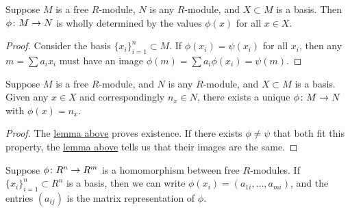 \begin{lemma}\label{lem:free-module-homomorphism}
    Suppose \(M\) is a free \(R\)-module, \(N\) is any \(R\)-module,
    and \(X \subset M\) is a basis.
    Then \(\phi\colon M\to N\) is wholly determined by the values \(\phi(x)\) for all \(x \in X\).
\end{lemma}
\begin{proof}
    Consider the basis \({\{x_i\}}_{i=1}^n \subset M\).
    If \(\phi(x_i) = \psi(x_i)\) for all \(x_i\),
    then any \(m = \sum a_i x_i\) must have an image
    \(\phi(m) = \sum a_i \phi(x_i) = \psi(m)\).
\end{proof}
\begin{theorem}
    Suppose \(M\) is a free \(R\)-module, and \(N\) is any \(R\)-module,
    and \(X \subset M\) is a basis.
    Given any \(x \in X\) and correspondingly \(n_x \in N\),
    there exists a unique \(\phi\colon M\to N\) with \(\phi(x) = n_x\).
\end{theorem}
\begin{proof}
    The \hyperref[lem:free-module-homomorphism]{lemma above} proves existence.
    If there exists \(\phi \neq \psi\) that both fit this property,
    the \hyperref[lem:free-module-homomorphism]{lemma above}
    tells us that their images are the same.
\end{proof}
\begin{definition}
    Suppose \(\phi\colon R^n\to R^m\) is a homomorphism between free \(R\)-modules.
    If \({\{x_i\}}_{i=1}^n \subset R^n\) is a basis,
    then we can write \(\phi(x_i) = (a_{1i},\hdots,a_{mi})\),
    and the entries \((a_{ij})\) is the matrix representation of \(\phi\).
\end{definition}

